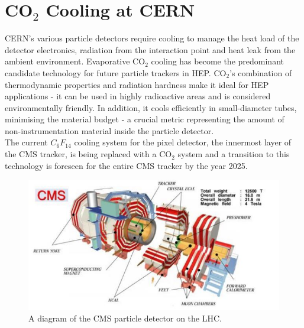 \documentclass{report}
\begin{document}
\section{CO\texorpdfstring{$_2$}{TEXT} Cooling at CERN}
CERN's various particle detectors require cooling to manage the heat load of the detector electronics, radiation from the interaction point and heat leak from the ambient environment. Evaporative CO$_2$ cooling has become the predominant candidate technology for future particle trackers in HEP.\cite{mishra} CO$_2$'s combination of thermodynamic properties and radiation hardness make it ideal for HEP applications - it can be used in highly radioactive areas and is considered environmentally friendly. In addition, it cools efficiently in small-diameter tubes, minimising the material budget - a crucial metric representing the amount of non-instrumentation material inside the particle detector. \cite{jerome} \\The current $C_6F_{14}$ cooling system for the pixel detector, the innermost layer of the CMS tracker, is  being replaced with a CO$_2$ system and a transition to this technology is foreseen for the entire CMS tracker by the year 2025.

\begin{figure}[h!]
\includegraphics[width=\textwidth]{figures/CMS.jpg}
\caption{A diagram of the CMS particle detector on the LHC. \cite{mishra}}
\label{fig: cms}
\end{figure}	
\FloatBarrier
\end{document}
